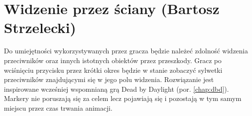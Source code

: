 \section{Widzenie przez ściany (Bartosz Strzelecki)}

Do umiejętności wykorzystywanych przez gracza będzie należeć zdolność widzenia przeciwników oraz innych istotnych obiektów przez przeszkody.
Gracz po wciśnięciu przycisku przez krótki okres będzie w stanie zobaczyć sylwetki przeciwników znajdującymi się w jego polu widzenia.
Rozwiązanie jest inspirowane wcześniej wspomnianą grą Dead by Daylight (por. \ref{chap:dbd}). Markery nie poruszają się za celem lecz pojawiają się i pozostają w tym samym miejscu przez czas trwania animacji.


